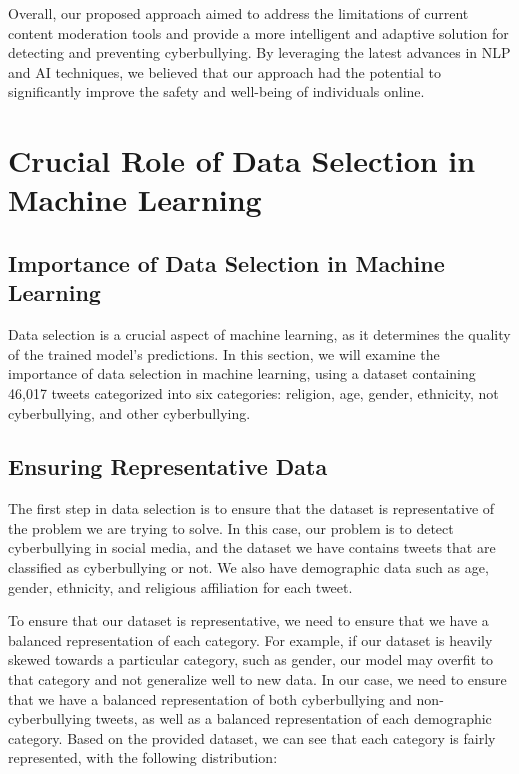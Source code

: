 \documentclass[conference]{IEEEtran}
\begin{document}
Overall, our proposed approach aimed to address the limitations of current content moderation tools and provide a more intelligent and adaptive solution for detecting and preventing cyberbullying. By leveraging the latest advances in NLP and AI techniques, we believed that our approach had the potential to significantly improve the safety and well-being of individuals online.

\section{Crucial Role of Data Selection in Machine Learning}

\subsection{Importance of Data Selection in Machine Learning}

Data selection is a crucial aspect of machine learning, as it determines the quality of the trained model's predictions. In this section, we will examine the importance of data selection in machine learning, using a dataset containing 46,017 tweets categorized into six categories: religion, age, gender, ethnicity, not cyberbullying, and other cyberbullying.

\subsection{Ensuring Representative Data}

The first step in data selection is to ensure that the dataset is representative of the problem we are trying to solve. In this case, our problem is to detect cyberbullying in social media, and the dataset we have contains tweets that are classified as cyberbullying or not. We also have demographic data such as age, gender, ethnicity, and religious affiliation for each tweet.

To ensure that our dataset is representative, we need to ensure that we have a balanced representation of each category. For example, if our dataset is heavily skewed towards a particular category, such as gender, our model may overfit to that category and not generalize well to new data. In our case, we need to ensure that we have a balanced representation of both cyberbullying and non-cyberbullying tweets, as well as a balanced representation of each demographic category.
Based on the provided dataset, we can see that each category is fairly represented, with the following distribution:
\end{document}
